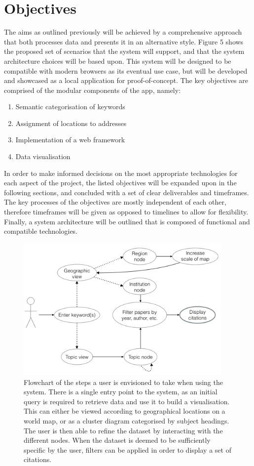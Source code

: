 \documentclass[PROP_AGutteridge_CS.tex]{subfiles}
\begin{document}
\chapter{Objectives}
The aims as outlined previously will be achieved by a comprehensive approach that both processes data and presents it in an alternative style. Figure 5 shows the proposed set of scenarios that the system will support, and that the system architecture choices will be based upon. This system will be designed to be compatible with modern browsers as its eventual use case, but will be developed and showcased as a local application for proof-of-concept. The key objectives are comprised of the modular components of the app, namely:
\begin{enumerate}
\item{Semantic categorisation of keywords}
\item{Assignment of locations to addresses}
\item{Implementation of a web framework}
\item{Data visualisation} 
\end{enumerate}

\noindent In order to make informed decisions on the most appropriate technologies for each aspect of the project, the listed objectives will be expanded upon in the following sections, and concluded with a set of clear deliverables and timeframes. The key processes of the objectives are mostly independent of each other, therefore timeframes will be given as opposed to timelines to allow for flexibility. Finally, a system architecture will be outlined that is composed of functional and compatible technologies.

\begin{figure}[h!]
	\centering
	\includegraphics[width=300pt]{../lib/images/user-flowchart}
	\caption{Flowchart of the steps a user is envisioned to take when using the system. There is a single entry point to the system, as an initial query is required to retrieve data and use it to build a visualisation. This can either be viewed according to geographical locations on a world map, or as a cluster diagram categorised by subject headings. The user is then able to refine the dataset by interacting with the different nodes. When the dataset is deemed to be sufficiently specific by the user, filters can be applied in order to display a set of citations.}
\end{figure}\newpage
\end{document}
